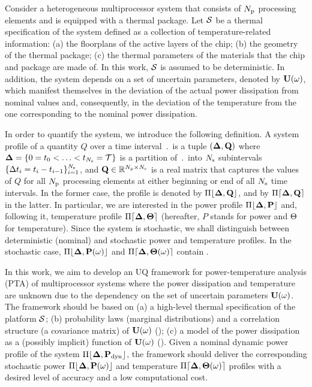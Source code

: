 
Consider a heterogeneous multiprocessor system that consists of ${N_\text{p}}$ processing elements and is equipped with a thermal package. Let $\mathcal{S}$ be a thermal specification of the system defined as a collection of temperature-related information: (a) the floorplans of the active layers of the chip; (b) the geometry of the thermal package; (c) the thermal parameters of the materials that the chip and package are made of. In this work, $\mathcal{S}$ is assumed to be deterministic. In addition, the system depends on a set of uncertain parameters, denoted by $\mathbf{U}(\omega)$, which manifest themselves in the deviation of the actual power dissipation from nominal values and, consequently, in the deviation of the temperature from the one corresponding to the nominal power dissipation.

In order to quantify the system, we introduce the following definition. A system profile of a quantity $Q$ over a time interval $\period$ is a tuple $(\part, \m{Q})$ where $\boldsymbol{\Delta} = \{ 0 = t_0 < \dotsc < t_{N_\text{s}} = \mathcal{T} \}$ is a partition of $\period$ into $N_\text{s}$ subintervals $\{ \Delta t_i = t_i - t_{i - 1} \}_{i = 1}^{N_\text{s}}$, and $\m{Q} \in \real^{\cores \times \steps}$ is a real matrix that captures the values of $Q$ for all ${N_\text{p}}$ processing elements at either beginning or end of all $N_\text{s}$ time intervals. In the former case, the profile is denoted by $\profB{\m{Q}}$, and by $\profE{\m{Q}}$ in the latter. In particular, we are interested in the power profile $\profP$ and, following it, temperature profile $\profT$ (hereafter, $P$ stands for power and $\Theta$ for temperature). Since the system is stochastic, we shall distinguish between deterministic (nominal) and stochastic power and temperature profiles. In the stochastic case, $\profP{\o}$ and $\profT{\o}$ contain \rvs.

In this work, we aim to develop an UQ framework for power-temperature analysis (PTA) of multiprocessor systems where the power dissipation and temperature are unknown due to the dependency on the set of uncertain parameters $\mathbf{U}(\omega)$. The framework should be based on (a) a high-level thermal specification of the platform $\mathcal{S}$; (b) probability laws (marginal distributions) and a correlation structure (a covariance matrix) of $\mathbf{U}(\omega)$ (); (c) a model of the power dissipation as a (possibly implicit) function of $\mathbf{U}(\omega)$ (). Given a nominal dynamic power profile of the system $\profPdyn$, the framework should deliver the corresponding stochastic power $\profP{\o}$ and temperature $\profT{\o}$ profiles with a desired level of accuracy and a low computational cost.
